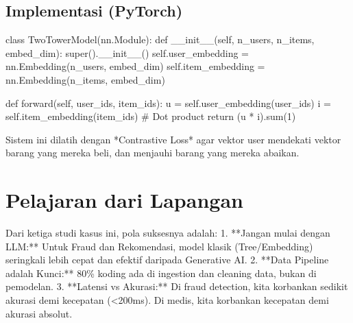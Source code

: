 \subsection{Implementasi (PyTorch)}
\begin{codeblock}[language=Python]
class TwoTowerModel(nn.Module):
    def __init__(self, n_users, n_items, embed_dim):
        super().__init__()
        self.user_embedding = nn.Embedding(n_users, embed_dim)
        self.item_embedding = nn.Embedding(n_items, embed_dim)

    def forward(self, user_ids, item_ids):
        u = self.user_embedding(user_ids)
        i = self.item_embedding(item_ids)
        # Dot product
        return (u * i).sum(1)
\end{codeblock}

Sistem ini dilatih dengan *Contrastive Loss* agar vektor user mendekati vektor barang yang mereka beli, dan menjauhi barang yang mereka abaikan.

\section{Pelajaran dari Lapangan}
Dari ketiga studi kasus ini, pola suksesnya adalah:
1. **Jangan mulai dengan LLM:** Untuk Fraud dan Rekomendasi, model klasik (Tree/Embedding) seringkali lebih cepat dan efektif daripada Generative AI.
2. **Data Pipeline adalah Kunci:** 80\% koding ada di ingestion dan cleaning data, bukan di pemodelan.
3. **Latensi vs Akurasi:** Di fraud detection, kita korbankan sedikit akurasi demi kecepatan (<200ms). Di medis, kita korbankan kecepatan demi akurasi absolut.
